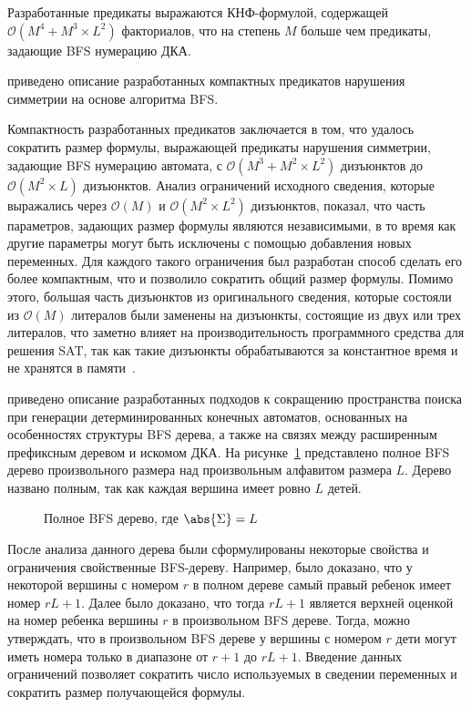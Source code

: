 Разработанные предикаты выражаются КНФ-формулой, содержащей $\mathcal{O}\left(M^{4} + M^{3} \times L^{2}\right)$ факториалов, что на степень $M$ больше чем предикаты, задающие BFS нумерацию ДКА.

\insection{\ref{sec:space:tight}} приведено описание разработанных компактных предикатов нарушения симметрии на основе алгоритма BFS.

Компактность разработанных предикатов заключается в том, что удалось сократить размер формулы, выражающей предикаты нарушения симметрии, задающие BFS нумерацию автомата, с $\mathcal{O}\left(M^{3} + M^{2} \times L^{2}\right)$ дизъюнктов до $\mathcal{O}\left(M^{2} \times L\right)$ дизъюнктов.
Анализ ограничений исходного сведения, которые выражались через $\mathcal{O}\left(M\right)$ и $\mathcal{O}\left(M^{2} \times L^{2}\right)$ дизъюнктов, показал, что часть параметров, задающих размер формулы являются независимыми, в то время как другие параметры могут быть исключены с помощью добавления новых переменных. 
Для каждого такого ограничения был разработан способ сделать его более компактным, что и позволило сократить общий размер формулы.
Помимо этого, б\emph{о}льшая часть дизъюнктов из оригинального сведения, которые состояли из $\mathcal{O}\left(M\right)$ литералов
были заменены на дизъюнкты, состоящие из двух или трех литералов, что заметно влияет на производительность программного средства для решения SAT, так как такие дизъюнкты обрабатываются за константное время и не хранятся в памяти~\cite{MSilva-SATbook09}.

\insection{\ref{sec:space:pruning}} приведено описание разработанных подходов к сокращению пространства поиска при генерации детерминированных конечных автоматов, основанных на особенностях структуры BFS дерева, а также на связях между расширенным префиксным деревом и искомом ДКА.
На рисунке~\ref{syn:img:full-bfs} представлено полное BFS дерево произвольного размера над произвольным алфавитом размера $L$.
Дерево названо полным, так как каждая вершина имеет ровно $L$ детей.

\begin{figure}[ht]
  \centering
  \scalebox{0.625}{}
  \caption{Полное BFS дерево, где $\abs{\Sigma}=L$}
  \label{syn:img:full-bfs}
\end{figure}

После анализа данного дерева были сформулированы некоторые свойства и ограничения свойственные BFS-дереву.
Например, было доказано, что у некоторой вершины с номером $r$ в полном дереве самый правый ребенок имеет номер $rL + 1$.
Далее было доказано, что тогда $rL + 1$ является верхней оценкой на номер ребенка вершины $r$ в произвольном BFS дереве.
Тогда, можно утверждать, что в произвольном BFS дереве у вершины с номером $r$ дети могут иметь номера только в диапазоне от $r + 1$ до $rL + 1$.
Введение данных ограничений позволяет сократить число используемых в сведении переменных и сократить размер получающейся формулы.

